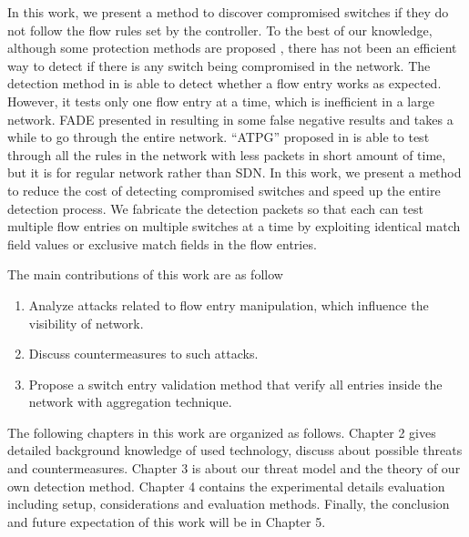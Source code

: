\sout{}
In this work, we present a method to discover compromised switches if they do not follow the flow rules set by the controller. To the best of our knowledge, although some protection methods are proposed \cite{CKGL15,PJL16}, there has not been an efficient way to detect if there is any switch being compromised in the network. The detection method in \cite{CKGL15} is able to detect whether a flow entry works as expected. However, it tests only one flow entry at a time, which is inefficient in a large network. FADE presented in \cite{PJL16} resulting in some false negative results and takes a while to go through the entire network. ``ATPG'' proposed in \cite{ZKVM12} is able to test through all the rules in the network with less packets in short amount of time, but it is for regular network rather than SDN. In this work, we present a method to reduce the cost of detecting compromised switches and speed up the entire detection process. We fabricate the detection packets so that each can test multiple flow entries on multiple switches at a time by exploiting identical match field values or exclusive match fields in the flow entries. 

The main contributions of this work are as follow 
\begin{enumerate}
\item
Analyze attacks related to flow entry manipulation, which influence the visibility of network.
\item
Discuss countermeasures to such attacks.
\item
Propose a switch entry validation method that verify all entries inside the network with aggregation technique.
\end{enumerate}

The following chapters in this work are organized as follows. Chapter 2 gives detailed background knowledge of used technology, discuss about possible threats and countermeasures. Chapter 3 is about our threat model and the theory of our own detection method. Chapter 4 contains the experimental details evaluation including setup, considerations and evaluation methods. Finally, the conclusion and future expectation of this work will be in Chapter 5.